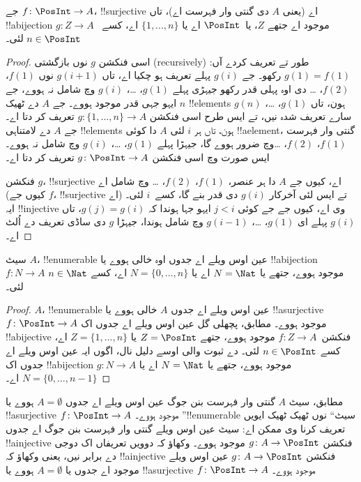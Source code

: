 \documentclass[../../../include/open-logic-section]{subfiles}
\begin{document}
\begin{prop}
جے $f\colon \PosInt \to A$، !!{surjective} اے (یعنی $A$ دی گنتی وار
فہرست اے)، تاں !!a{bijection} $g\colon Z \to A$ موجود اے جتھے $Z$،
یا~$\PosInt$ اے یا $\{1, \dots, n\}$ اے، کسے~$n \in \PosInt$ لئی۔
\end{prop}

\begin{proof}
  اسی فنکشن $g$ نوں بازگشتی (recursively) طور تے تعریف کردے آں:
  $g(1) = f(1)$
  رکھو۔ جے $g(i)$ پہلے تعریف ہو چکیا اے، تاں $g(i+1)$ نوں $f(1)$،
  $f(2)$، \dots{} دی اوہ پہلی قدر رکھو جیہڑی پہلے $g(1)$، \dots،
  $g(i)$ وچ شامل نہ ہووے، جے ایہو جہی قدر موجود ہووے۔ جے $A$ دے
  ٹھیک $n$ !!{element}s ہون، تاں $g(1)$، \dots، $g(n)$ سارے تعریف
  شدہ نیں، تے ایس طرح اسی فنکشن $g\colon \{1, \dots, n\} \to A$
  تعریف کر دتا اے۔ جے $A$ دے لامتناہی !!{element}s ہون، تاں ہر $i$
  لئی $A$ دا کوئی !!a{element}، گنتی وار فہرست $f(1)$، $f(2)$،
  \dots وچ ضرور ہووے گا، جیہڑا پہلے $g(1)$، \dots، $g(i)$ وچ شامل
  نہ ہووے۔ ایس صورت وچ اسی فنکشن $g\colon \PosInt \to A$ تعریف کر
  دتا اے۔

  فنکشن $g$، !!{surjective} اے، کیوں جے $A$ دا ہر عنصر، $f(1)$،
  $f(2)$، \dots{} وچ شامل اے (کیوں جے $f$، !!{surjective} اے) تے
  ایس لئی آخرکار $g(i)$ دی قدر بنے گا، کسے~$i$ لئی۔ ایہ !!{injective}
  وی اے، کیوں جے جے کوئی $j < i$ ایہو جہا ہوندا کہ $g(j) = g(i)$،
  تاں $g(i)$ پہلے ای $g(1)$، \dots، $g(i-1)$ وچ شامل ہوندا، جیہڑا
  $g$ دی ساڈی تعریف دے اُلٹ اے۔
\end{proof}

\begin{cor}
سیٹ $A$، !!{enumerable} عین اوس ویلے اے جدوں اوہ خالی ہووے یا
!!a{bijection} $f\colon N \to A$ موجود ہووے، جتھے یا $N = \Nat$ اے
یا $N = \{0, \dots, n\}$ اے، کسے $n \in \Nat$ لئی۔
\end{cor}

\begin{proof}
$A$، !!{enumerable} عین اوس ویلے اے جدوں $A$ خالی ہووے یا
!!a{surjective} $f\colon \PosInt \to A$ موجود ہووے۔
 مطابق، پچھلی گل عین اوس ویلے اے جدوں اک
!!a{bijective} فنکشن~$f\colon Z \to A$ موجود ہووے، جتھے
$Z = \PosInt$ یا $Z = \{1, \dots, n\}$ اے، کسے $n \in \PosInt$
لئی۔  دے ثبوت والی اوسے دلیل نال، اگوں ایہ عین
اوس ویلے اے جدوں اک !!a{bijection} $g\colon N \to A$ موجود ہووے،
جتھے یا $N = \Nat$ اے یا $N = \{0, \dots, n-1\}$ اے۔
\end{proof}

\begin{prob}
   مطابق، سیٹ $A$ گنتی وار فہرست
  بنن جوگ عین اوس ویلے اے جدوں $A = \emptyset$ ہووے یا !!a{surjective}
  $f\colon \PosInt \to A$ موجود ہووے۔ ”!!{enumerable} سیٹ“ نوں ٹھیک
  ٹھیک ایویں تعریف کرنا وی ممکن اے: سیٹ عین اوس ویلے گنتی وار فہرست
  بنن جوگ اے جدوں !!a{injective} فنکشن $g\colon A \to \PosInt$ موجود
  ہووے۔ وکھاؤ کہ دوویں تعریفاں اک دوجی دے برابر نیں، یعنی وکھاؤ کہ
  !!a{injective} فنکشن $g\colon A \to \PosInt$ عین اوس ویلے موجود اے
  جدوں یا $A = \emptyset$ ہووے یا !!a{surjective}
  $f\colon \PosInt \to A$ موجود ہووے۔
\end{prob}
\end{document}
